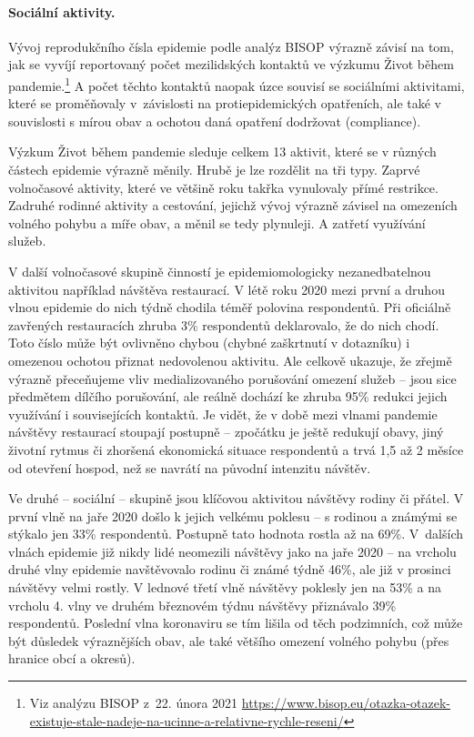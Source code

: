 \label{Socialni_aktivity}

\paragraph{Sociální aktivity.} Vývoj reprodukčního čísla epidemie podle analýz BISOP výrazně závisí na tom, jak se vyvíjí reportovaný počet mezilidských kontaktů ve výzkumu Život během pandemie.\footnote{Viz analýzu BISOP z 22. února 2021
\url{https://www.bisop.eu/otazka-otazek-existuje-stale-nadeje-na-ucinne-a-relativne-rychle-reseni/}} A počet těchto kontaktů naopak úzce souvisí se sociálními aktivitami, které se proměňovaly v závislosti na protiepidemických opatřeních, ale také v souvislosti s mírou obav a ochotou daná opatření dodržovat (compliance).

Výzkum Život během pandemie sleduje celkem 13 aktivit, které se v různých částech epidemie výrazně měnily. Hrubě je lze rozdělit na tři typy. Zaprvé volnočasové aktivity, které ve většině roku takřka vynulovaly přímé restrikce. Zadruhé rodinné aktivity a cestování, jejichž vývoj výrazně závisel na omezeních volného pohybu a míře obav, a měnil se tedy plynuleji. A zatřetí využívání služeb.

V další volnočasové skupině činností je epidemiomologicky nezanedbatelnou aktivitou například návštěva restaurací. V létě roku 2020 mezi první a druhou vlnou epidemie do nich týdně chodila téměř polovina respondentů. Při oficiálně zavřených restauracích zhruba 3\% respondentů deklarovalo, že do nich chodí. Toto číslo může být ovlivněno chybou (chybné zaškrtnutí v dotazníku) i omezenou ochotou přiznat nedovolenou aktivitu. Ale celkově ukazuje, že zřejmě výrazně přeceňujeme vliv medializovaného porušování omezení služeb – jsou sice předmětem dílčího porušování, ale reálně dochází ke zhruba 95\% redukci jejich využívání i souvisejících kontaktů. Je vidět, že v době mezi vlnami pandemie návštěvy restaurací stoupají postupně – zpočátku je ještě redukují obavy, jiný životní rytmus či zhoršená ekonomická situace respondentů a trvá 1,5 až 2 měsíce od otevření hospod, než se navrátí na původní intenzitu návštěv.

Ve druhé – sociální – skupině jsou klíčovou aktivitou návštěvy rodiny či přátel. V první vlně na jaře 2020 došlo k jejich velkému poklesu – s rodinou a známými se stýkalo jen 33\% respondentů. Postupně tato hodnota rostla až na 69\%. V dalších vlnách epidemie
již nikdy lidé neomezili návštěvy jako na jaře 2020 – na vrcholu druhé vlny epidemie navštěvovalo rodinu či známé týdně 46\%, ale již v prosinci návštěvy velmi rostly. V lednové třetí vlně návštěvy poklesly jen na 53\% a na vrcholu 4. vlny ve druhém březnovém týdnu návštěvy přiznávalo 39\% respondentů. Poslední vlna koronaviru se tím lišila od těch podzimních, což může být důsledek výraznějších obav, ale také většího omezení volného pohybu (přes hranice obcí a okresů).

